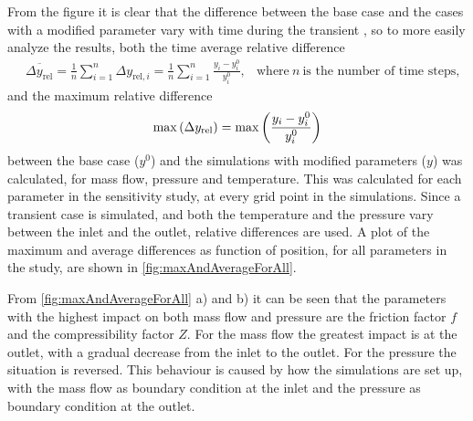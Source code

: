 From the figure it is clear that the difference between the base case and the cases with a modified parameter vary with time during the transient%
, so to more easily analyze the results, both the time average relative difference
\begin{align}
    &\overbar{\Delta y_\mathrm{rel}}
    = \frac{1}{n} \sum_{i=1}^n \Delta y_{\mathrm{rel}, i}
    = \frac{1}{n} \sum_{i=1}^n \frac{y_i - y_i^0}{y_i^0},
    &\text{where}~n~\text{is the number of time steps,}
\end{align}
and the maximum relative difference
\begin{align}
    \max\del{\Delta y_\mathrm{rel}} = \max\del{\frac{y_i - y_i^0}{y_i^0}}
\end{align}
between the base case ($y^0$) and the simulations with modified parameters ($y$) was calculated, for mass flow, pressure and temperature. %
This was calculated for each parameter in the sensitivity study, at every grid point in the simulations. Since a transient case is simulated, and both the temperature and the pressure vary between the inlet and the outlet, relative differences are used. %
%
%
A plot of the maximum and average differences as function of position, for all parameters in the study, are shown in \cref{fig:maxAndAverageForAll}.%

From \cref{fig:maxAndAverageForAll} a) and b) it can be seen that the parameters with the highest impact on both mass flow and pressure are the friction factor $f$ and the compressibility factor $Z$. For the mass flow the greatest impact is at the outlet, with a gradual decrease from the inlet to the outlet. For the pressure the situation is reversed. This behaviour is caused by how the simulations are set up, with the mass flow as boundary condition at the inlet and the pressure as boundary condition at the outlet.

